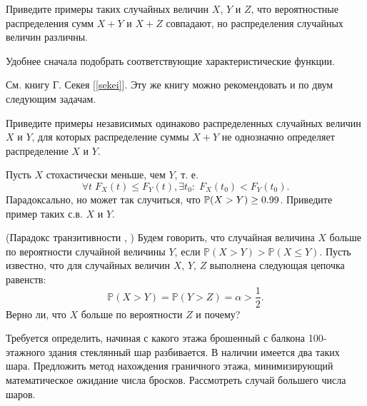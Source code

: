 \begin{problem}
Приведите примеры таких случайных величин $X$, $Y$ и $Z$, что вероятностные распределения сумм $X+Y$ и $X+Z$ совпадают, но распределения случайных величин различны.
\end{problem}
\begin{ordre}
Удобнее сначала подобрать соответствующие характеристические функции.
\end{ordre}
\begin{remark}
См. книгу Г. Секея [\ref{sekei}]. Эту же книгу можно рекомендовать и по двум следующим задачам.
\end{remark}

\begin{problem}
Приведите примеры независимых одинаково распределенных случайных величин $X$ и $Y$, для которых распределение суммы  $X+Y$ не однозначно определяет распределение $X$ и $Y$.
\end{problem}


\begin{problem}
Пусть 
  $X$ стохастически меньше, чем $Y$, т. е. 
 $$\forall t \; F_X(t) \leq F_Y(t), \exists t_0: \; F_X(t_0) < F_Y(t_0).$$
 Парадоксально, но может так случиться, что 
  $\mathrm{{\mathbb P}}(X > Y) \geq 0.99$. Приведите пример таких с.в. $X$ и $Y$.
\end{problem}

\begin{problem}(Парадокс транзитивности \cite{2013}, \cite{book12})
Будем говорить, что случайная величина $X$ больше по вероятности случайной величины $Y$, если ${\mathbb P}(X>Y)>{\mathbb P}(X\le Y)$. 
Пусть известно, что для случайных величин $X$, $Y$, $Z$ выполнена следующая цепочка равенств: 
$$
{\mathbb P}(X>Y)={\mathbb P}(Y>Z)=\alpha>\frac{1}{2} . 
$$
Верно ли, что $X$ больше по вероятности $Z$ и почему? 
\end{problem}




\begin{problem}

Требуется определить, начиная с какого этажа брошенный с балкона 100-этажного здания стеклянный шар разбивается. В наличии имеется два таких шара. Предложить метод нахождения граничного этажа, минимизирующий математическое ожидание числа бросков. Рассмотреть случай большего числа шаров.  

\end{problem}

